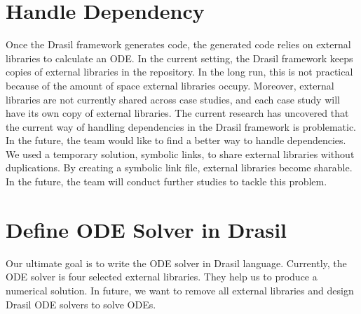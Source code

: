 \section{Handle Dependency}
Once the Drasil framework generates code, the generated code relies on external libraries to calculate an ODE. In the current setting, the Drasil framework keeps copies of external libraries in the repository. In the long run, this is not practical because of the amount of space external libraries occupy. Moreover, external libraries are not currently shared across case studies, and each case study will have its own copy of external libraries. The current research has uncovered that the current way of handling dependencies in the Drasil framework is problematic. In the future, the team would like to find a better way to handle dependencies. We used a temporary solution, symbolic links, to share external libraries without duplications. By creating a symbolic link file, external libraries become sharable. In the future, the team will conduct further studies to tackle this problem.

\section{Define ODE Solver in Drasil}
Our ultimate goal is to write the ODE solver in Drasil language. Currently, the ODE solver is four selected external libraries. They help us to produce a numerical solution. In future, we want to remove all external libraries and design Drasil ODE solvers to solve ODEs. 
